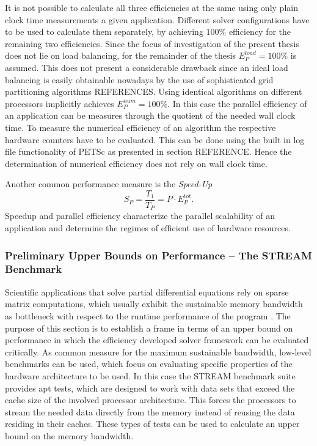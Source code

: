It is not possible to calculate all three efficiencies at the same using only plain clock time measurements a given application.  Different solver configurations have to be used to calculate them separately, by achieving \(100 \% \) efficiency for the remaining two efficiencies. Since the focus of investigation of the present thesis does not lie on load balancing, for the remainder of the thesis \(E^{load}_P = 100\%  \) is assumed. This does not present a considerable drawback since an ideal load balancing is easily obtainable nowadays by the use of sophisticated grid partitioning algorithms \cite{loadbalancing} REFERENCES. Using identical algorithms on different processors implicitly achieves \(E^{num}_P = 100 \%\). In this case the parallel efficiency of an application can be measures through the quotient of the needed wall clock time. To measure the numerical efficiency of an algorithm the respective hardware counters have to be evaluated. This can be done using the built in log file functionality of PETSc as presented in section REFERENCE. Hence the determination of numerical efficiency does not rely on wall clock time.

Another common performance measure is the \emph{Speed-Up}
\begin{displaymath}
  S_P = \frac{T_1}{T_P} = P \cdot E^{tot}_P.
\end{displaymath}
Speedup and parallel efficiency characterize the parallel scalability of an application and determine the regimes of efficient use of hardware resources.

\subsubsection{Preliminary Upper Bounds on Performance -- The STREAM Benchmark}

Scientific applications that solve partial differential equations rely on sparse matrix computations, which usually exhibit the sustainable memory bandwidth as bottleneck with respect to the runtime performance of the program \cite{hager11}. The purpose of this section is to establish a frame in terms of an upper bound on performance in which the efficiency developed solver framework can be evaluated critically. As common measure for the maximum sustainable bandwidth, low-level benchmarks can be used, which focus on evaluating specific properties of the hardware architecture to be used. In this case the STREAM benchmark suite provides apt tests, which are designed to work with data sets that exceed the cache size of the involved processor architecture. This forces the processors to stream the needed data directly from the memory instead of reusing the data residing in their caches. These types of tests can be used to calculate an upper bound on the memory bandwidth.

